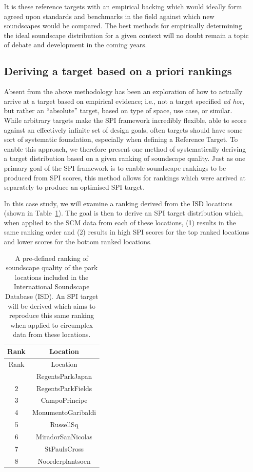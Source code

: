 \documentclass[
  authoryear,
  preprint,
  3p]{elsarticle}
\begin{document}
It is these reference targets with an empirical backing which would
ideally form agreed upon standards and benchmarks in the field against
which new soundscapes would be compared. The best methods for
empirically determining the ideal soundscape distribution for a given
context will no doubt remain a topic of debate and development in the
coming years.

\subsection{Deriving a target based on a priori
rankings}\label{sec-targets}

Absent from the above methodology has been an exploration of how to
actually arrive at a target based on empirical evidence; i.e., not a
target specified \emph{ad hoc}, but rather an ``absolute'' target, based
on type of space, use case, or similar. While arbitrary targets make the
SPI framework incredibly flexible, able to score against an effectively
infinite set of design goals, often targets should have some sort of
systematic foundation, especially when defining a Reference Target. To
enable this approach, we therefore present one method of systematically
deriving a target distribution based on a given ranking of soundscape
quality. Just as one primary goal of the SPI framework is to enable
soundscape rankings to be produced from SPI scores, this method allows
for rankings which were arrived at separately to produce an optimised
SPI target.

In this case study, we will examine a ranking derived from the ISD
locations (shown in Table~\ref{tbl-isd-ranking}). The goal is then to
derive an SPI target distribution which, when applied to the SCM data
from each of these locations, (1) results in the same ranking order and
(2) results in high SPI scores for the top ranked locations and lower
scores for the bottom ranked locations.

\begin{longtable}[]{@{}cc@{}}
\caption{A pre-defined ranking of soundscape quality of the park
locations included in the International Soundscape Database (ISD). An
SPI target will be derived which aims to reproduce this same ranking
when applied to circumplex data from these
locations.}\label{tbl-isd-ranking}\tabularnewline
\toprule\noalign{}
Rank & Location \\
\midrule\noalign{}
\endfirsthead
\toprule\noalign{}
Rank & Location \\
\midrule\noalign{}
\endhead
\bottomrule\noalign{}
\endlastfoot
1 & RegentsParkJapan \\
2 & RegentsParkFields \\
3 & CampoPrincipe \\
4 & MonumentoGaribaldi \\
5 & RussellSq \\
6 & MiradorSanNicolas \\
7 & StPaulsCross \\
8 & Noorderplantsoen \\
\end{longtable}
\end{document}
